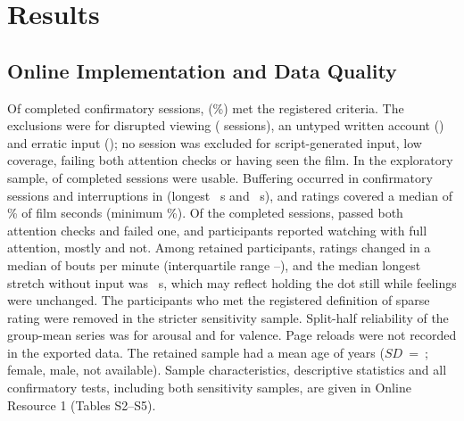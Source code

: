\documentclass[man,12pt,british]{apa7}
\begin{document}
\section{Results}

\subsection{Online Implementation and Data Quality}

Of  completed confirmatory sessions,  (\%) met
the registered criteria. The exclusions were for disrupted viewing ( sessions), an untyped
written account () and erratic input (); no session was excluded for
script-generated input, low coverage, failing both attention checks or having seen the film. In the exploratory sample,  of
 completed sessions were usable. Buffering occurred in 
confirmatory sessions and interruptions in  (longest ~s
and ~s), and ratings covered a median of \% of film seconds
(minimum \%). Of the completed sessions,  passed both attention
checks and  failed one, and  participants reported watching with
full attention,  mostly and  not. Among retained
participants, ratings changed in a median of  bouts per minute (interquartile range
--), and the median longest stretch without input was
~s, which may reflect holding the dot still while feelings were unchanged. The
 participants who met the registered definition of sparse rating were removed in the stricter
sensitivity sample. Split-half reliability of the group-mean series was  for arousal and
 for valence. Page reloads were not recorded in the exported data. The retained sample had a mean age of  years ($SD$~=~;  female,
 male,  not available). Sample characteristics, descriptive statistics and all
confirmatory tests, including both sensitivity samples, are given in Online Resource 1 (Tables S2--S5).
\end{document}
